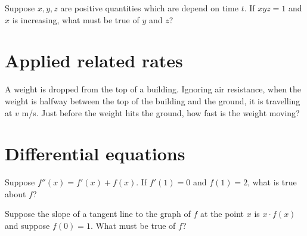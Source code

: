 \documentclass{ximera}
\begin{document}
\begin{problem}
  Suppose $x, y, z$ are positive quantities which are depend on time
  $t$.  If $xyz = 1$ and $x$ is increasing, what must be true of $y$ and $z$?
  \begin{multipleChoice}
  \end{multipleChoice}
\end{problem}

\clearpage

\section{Applied related rates}

\begin{problem}
  A weight is dropped from the top of a building.  Ignoring air
  resistance, when the weight is halfway between the top of the
  building and the ground, it is travelling at $v$ m/s.  Just before
  the weight hits the ground, how fast is the weight moving?
  \begin{multipleChoice}
  \end{multipleChoice}
\end{problem}

\clearpage

\section{Differential equations}

\begin{problem}
  Suppose $f''(x) = f'(x) + f(x)$.  If $f'(1) = 0$ and $f(1) = 2$, what is true about $f$?
  \begin{multipleChoice}
  \end{multipleChoice}
\end{problem}

\begin{problem}
  Suppose the slope of a tangent line to the graph of $f$ at the point $x$ is $x \cdot f(x)$ and suppose $f(0) = 1$.  What must be true of $f$?
  \begin{multipleChoice}
  \end{multipleChoice}
\end{problem}
\end{document}
